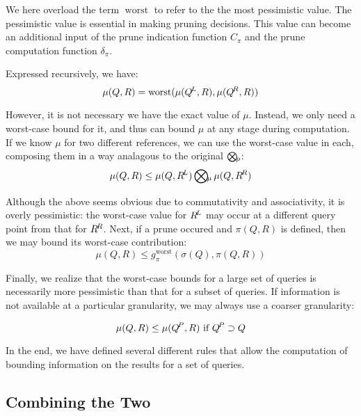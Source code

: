 \documentclass[times, 10pt,twocolumn]{article}
\DeclareMathOperator*{\worst}{worst}
\newcommand{\kdleft}{\hspace{-0.02in}^L}
\newcommand{\kdright}{\hspace{-0.02in}^R}
\newcommand{\kdparent}{\hspace{-0.02in}^P}
\newcommand{\myOp}[1]{\mathop{\bigotimes\nolimits\hspace{-0.045in}_{#1}}}
\newcommand{\allpi}{\pi}
\newcommand{\gpi}{g_{\pi}}
\newcommand{\canprunepi}{C_{\pi}}
\newcommand{\deltapi}{\delta_{\pi}}
\newcommand{\Oprho}{\myOp{\rho}}
\newcommand{\allmu}{\mu}
\newcommand{\Opmu}{\myOp{\mu}}
\newcommand{\allsigma}{\sigma}
\begin{document}
\noindent We here overload the term $\worst$ to refer to the the most pessimistic value.
The pessimistic value is essential in making pruning decisions.
This value can become an additional input of the prune indication function $\canprunepi$ and the prune computation function $\deltapi$.

Expressed recursively, we have:
\begin{equation}
\allmu(Q, R) = \worst(\allmu(Q\kdleft, R), \allmu(Q\kdright, R))
\label{eqn:dividemu}
\end{equation}

\noindent However, it is not necessary we have the exact value of $\allmu$.
Instead, we only need a worst-case bound for it, and thus can bound $\allmu$ at any stage during computation.
If we know $\allmu$ for two different references, we can use the worst-case value in each, composing them in a way analagous to the original $\Oprho$:
\begin{equation}
\allmu(Q, R) \leq \allmu(Q, R\kdleft) \Opmu \allmu(Q, R\kdright)
\label{eqn:combinemu}
\end{equation}

\noindent Although the above seems obvious due to commutativity and associativity, it is overly pessimistic: the worst-case value for $R\kdleft$ may occur at a different query point from that for $R\kdright$.
Next, if a prune occured and $\pi(Q, R)$ is defined, then we may bound its worst-case contribution:
\begin{equation}
\allmu(Q, R) \leq \gpi^{\worst}(\allsigma(Q), \allpi(Q, R))
\label{eqn:pimu}
\end{equation}

\noindent Finally, we realize that the worst-case bounds for a large set of queries is necessarily more pessimistic than that for a subset of queries.
If information is not available at a particular granularity, we may always use a coarser granularity:

\begin{equation}
\allmu(Q, R) \leq \allmu(Q\kdparent, R) \text{ if } Q\kdparent \supset Q
\end{equation}

\noindent In the end, we have defined several different rules that allow the computation of bounding information on the results for a set of queries.


\subsection{Combining the Two}
\end{document}
